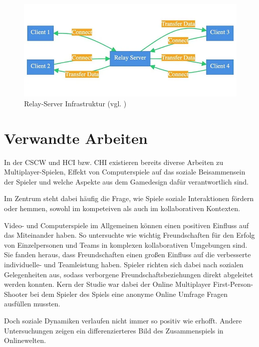 \begin{figure}[ht]
\centering
\includegraphics[width=1\linewidth]{content/pictures/0_o7LJU1ImxPHIM5Ej.png}
\caption{Relay-Server Infrastruktur (vgl. \cite{mygames_unity_2024})}
\label{fig:relay-server}
\end{figure}


\chapter{Verwandte Arbeiten}
In der \ac{CSCW} und \ac{HCI} bzw. \ac{CHI} existieren bereits diverse Arbeiten zu Multiplayer-Spielen, Effekt von Computerspiele auf das soziale Beisammensein der Spieler und welche Aspekte aus dem Gamedesign dafür verantwortlich sind.

Im Zentrum steht dabei häufig die Frage, wie Spiele soziale Interaktionen fördern oder hemmen, sowohl im kompeteiven als auch im kollaborativen Kontexten.

Video- und Computerspiele im Allgemeinen können einen positiven Einfluss auf das Miteinander haben. So untersuchte \cite{mason_friends_2013} wie wichtig Freundschaften für den Erfolg von Einzelpersonen und Teams in komplexen kollaborativen Umgebungen sind. Sie fanden heraus, dass Freundschaften einen großen Einfluss auf die verbesserte individuelle- und Teamleistung haben. Spieler richten sich dabei nach sozialen Gelegenheiten aus, sodass verborgene Freundschaftsbeziehungen direkt abgeleitet werden konnten. Kern der Studie war dabei der Online Multiplayer First-Person-Shooter  bei dem Spieler des Spiels eine anonyme Online Umfrage Fragen ausfüllen mussten. 

Doch soziale Dynamiken verlaufen nicht immer so positiv wie erhofft. Andere Untersuchungen zeigen ein differenzierteres Bild des Zusammenspiels in Onlinewelten.

